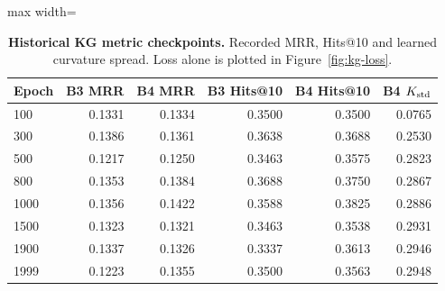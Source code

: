 \begin{table}[H]
\centering
\caption{\textbf{Historical KG metric checkpoints.} Recorded MRR, Hits@10 and learned curvature spread. Loss alone is plotted in Figure~\ref{fig:kg-loss}.}
\label{tab:kg-checkpoints}
\footnotesize\setlength{\tabcolsep}{4.2pt}\renewcommand{\arraystretch}{1.12}
\begin{adjustbox}{max width=\linewidth}
\begin{tabular}{lrrrrr}
\toprule
Epoch & B3 MRR & B4 MRR & B3 Hits@10 & B4 Hits@10 & B4 $K_{\rm std}$ \\
\midrule
100 & 0.1331 & 0.1334 & 0.3500 & 0.3500 & 0.0765 \\
300 & 0.1386 & 0.1361 & 0.3638 & 0.3688 & 0.2530 \\
500 & 0.1217 & 0.1250 & 0.3463 & 0.3575 & 0.2823 \\
800 & 0.1353 & 0.1384 & 0.3688 & 0.3750 & 0.2867 \\
1000 & 0.1356 & 0.1422 & 0.3588 & 0.3825 & 0.2886 \\
1500 & 0.1323 & 0.1321 & 0.3463 & 0.3538 & 0.2931 \\
1900 & 0.1337 & 0.1326 & 0.3337 & 0.3613 & 0.2946 \\
1999 & 0.1223 & 0.1355 & 0.3500 & 0.3563 & 0.2948 \\
\bottomrule
\end{tabular}
\end{adjustbox}
\end{table}
